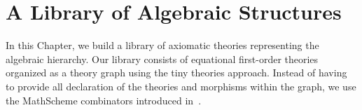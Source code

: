 \chapter{A Library of Algebraic Structures}
\label{ch:library}

In this Chapter, we build a library of axiomatic theories representing the algebraic hierarchy. 
Our library consists of equational first-order theories organized as a theory graph using the tiny theories approach. Instead of having to provide all declaration of the theories and morphisms within the graph, we use the MathScheme combinators introduced in~\cite{CaretteOConnorTPC, carette2018building}. 

